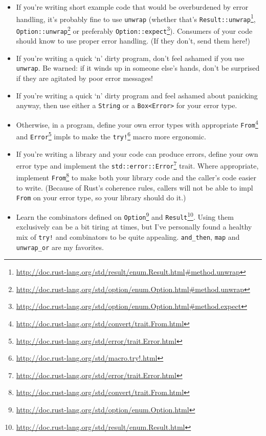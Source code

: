 \documentclass[a4paper,]{book}
\renewcommand{\href}[2]{#2\footnote{\url{#1}}}
\providecommand{\tightlist}{%
  \setlength{\itemsep}{0pt}\setlength{\parskip}{0pt}}
\begin{document}
\begin{itemize}
\tightlist
\item
  If you're writing short example code that would be overburdened by
  error handling, it's probably fine to use \texttt{unwrap} (whether
  that's
  \href{http://doc.rust-lang.org/std/result/enum.Result.html\#method.unwrap}{\texttt{Result::unwrap}},
  \href{http://doc.rust-lang.org/std/option/enum.Option.html\#method.unwrap}{\texttt{Option::unwrap}}
  or preferably
  \href{http://doc.rust-lang.org/std/option/enum.Option.html\#method.expect}{\texttt{Option::expect}}).
  Consumers of your code should know to use proper error handling. (If
  they don't, send them here!)
\item
  If you're writing a quick `n' dirty program, don't feel ashamed if you
  use \texttt{unwrap}. Be warned: if it winds up in someone else's
  hands, don't be surprised if they are agitated by poor error messages!
\item
  If you're writing a quick `n' dirty program and feel ashamed about
  panicking anyway, then use either a \texttt{String} or a
  \texttt{Box\textless{}Error\textgreater{}} for your error type.
\item
  Otherwise, in a program, define your own error types with appropriate
  \href{http://doc.rust-lang.org/std/convert/trait.From.html}{\texttt{From}}
  and
  \href{http://doc.rust-lang.org/std/error/trait.Error.html}{\texttt{Error}}
  impls to make the
  \href{http://doc.rust-lang.org/std/macro.try!.html}{\texttt{try!}}
  macro more ergonomic.
\item
  If you're writing a library and your code can produce errors, define
  your own error type and implement the
  \href{http://doc.rust-lang.org/std/error/trait.Error.html}{\texttt{std::error::Error}}
  trait. Where appropriate, implement
  \href{http://doc.rust-lang.org/std/convert/trait.From.html}{\texttt{From}}
  to make both your library code and the caller's code easier to write.
  (Because of Rust's coherence rules, callers will not be able to impl
  \texttt{From} on your error type, so your library should do it.)
\item
  Learn the combinators defined on
  \href{http://doc.rust-lang.org/std/option/enum.Option.html}{\texttt{Option}}
  and
  \href{http://doc.rust-lang.org/std/result/enum.Result.html}{\texttt{Result}}.
  Using them exclusively can be a bit tiring at times, but I've
  personally found a healthy mix of \texttt{try!} and combinators to be
  quite appealing. \texttt{and\_then}, \texttt{map} and
  \texttt{unwrap\_or} are my favorites.
\end{itemize}
\end{document}
